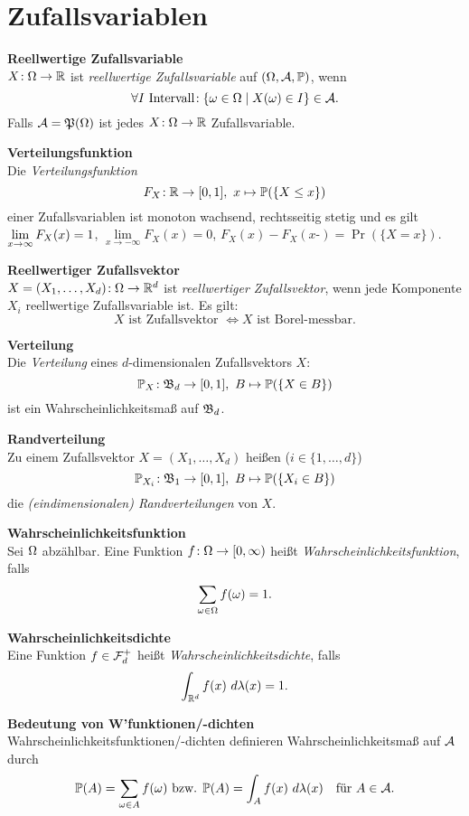 \section{Zufallsvariablen}
\textbf{Reellwertige Zufallsvariable}\\
$X\!: \Omega\to\mathbb{R}$ ist \textit{reellwertige Zufallsvariable} auf $(\Omega,\mathcal{A},\mathbb{P})$,
wenn
\[
  \forall I \text{ Intervall}\!: \{\omega\in\Omega \mid X(\omega) \in I\} \in \mathcal{A}.
\]
Falls $\mathcal{A} = \mathfrak{P}(\Omega)$ ist jedes $X\!: \Omega\to\mathbb{R}$ Zufallsvariable.

\textbf{Verteilungsfunktion}\\
Die \textit{Verteilungsfunktion}
\[
  F_X\!: \mathbb{R} \to [0,1],\ x \mapsto \mathbb{P}(\{X \leq x\})
\]
einer Zufallsvariablen ist monoton wachsend, rechtsseitig stetig und es gilt\\
$\lim\limits_{x\to\infty} F_X(x) = 1$,
$\lim\limits_{x\to -\infty} F_X(x) = 0$,
$F_X(x) - F_X(x\textbf{-}) = \Pr(\{X = x\})$.

\textbf{Reellwertiger Zufallsvektor}\\
$X = (X_1,\ldots,X_d)\!: \Omega\to\mathbb{R}^d$ ist \textit{reellwertiger Zufallsvektor},
wenn jede Komponente $X_i$ reellwertige Zufallsvariable ist.
Es gilt:\\
\[
  X \text{ ist Zufallsvektor } \Leftrightarrow X \text{ ist Borel-messbar.}
\]

\textbf{Verteilung}\\
Die \textit{Verteilung} eines $d$-dimensionalen Zufallsvektors $X$:
\[
  \mathbb{P}_X\!: \mathfrak{B}_d \to [0,1],\ B \mapsto \mathbb{P}(\{X \in B\})
\]
ist ein Wahrscheinlichkeitsmaß auf $\mathfrak{B}_d$.

\textbf{Randverteilung}\\
Zu einem Zufallsvektor $X = (X_1,\ldots,X_d)$ heißen ($i\in\{1,\ldots,d\}$)
\[
  \mathbb{P}_{X_i}\!: \mathfrak{B}_1 \to [0,1],\ B \mapsto \mathbb{P}(\{X_i \in B\})
\]
die \textit{(eindimensionalen) Randverteilungen} von $X$.

\textbf{Wahrscheinlichkeitsfunktion}\\
Sei $\Omega$ abzählbar.
Eine Funktion $f\!: \Omega \to [0,\infty)$ heißt
\textit{Wahrscheinlichkeitsfunktion}, falls
\[
  \sum_{\omega\in\Omega} f(\omega) = 1.
\]

\textbf{Wahrscheinlichkeitsdichte}\\
Eine Funktion $f\in\mathcal{F}_d^+$ heißt \textit{Wahrscheinlichkeitsdichte},
falls
\[
  \int_{\mathbb{R}^d} f(x)~d\lambda(x) = 1.
\]

\textbf{Bedeutung von W'funktionen/-dichten}\\
Wahrscheinlichkeitsfunktionen/-dichten definieren Wahrscheinlichkeitsmaß auf
$\mathcal{A}$ durch
\[
  \mathbb{P}(A) = \sum_{\omega \in A} f(\omega) \text{ bzw. } \mathbb{P}(A) = \int_A f(x)~d\lambda(x)
  \quad \text{für } A\in\mathcal{A}.
\]

